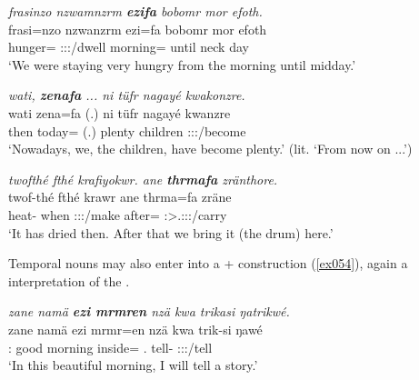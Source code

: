 \begin{exe}
	\ex \emph{frasinzo nzwamnzrm \textbf{ezifa} bobomr mor efoth.}\\
	\gll frasi=nzo nzwanzrm ezi=fa bobomr mor efoth\\
	hunger={\Only} \Fpl:\Sbj:\Pst:\Dur/dwell morning={\Abl} until neck day\\
	\trans `We were staying very hungry from the morning until midday.'\\ 
	\label{ex053}
\end{exe}
\begin{exe}
	\ex \emph{wati, \textbf{zenafa} ... ni tüfr nagayé kwakonzre.}\\
	\gll wati zena=fa (.) ni tüfr nagayé kwanzre\\
	then today={\Abl} (.) {\Fnsg} plenty children \Fpl:\Sbj:\Rpst:\Ipfv/become\\
	\trans `Nowadays, we, the children, have become plenty.' (lit. `From now on ...')\\ 
	\label{ex056}
\end{exe}
\begin{exe}
	\ex \emph{twofthé fthé krafiyokwr. ane \textbf{thrmafa} zränthore.}\\
	\gll twof-thé fthé krawr ane thrma=fa zräne\\
	heat-{\Adlzr} when \Stsg:\Sbj:\Irr:\Ipfv/make {\Dem} after={\Abl} \Fpl:\Sbj>\Tsg.\F:\Irr:\Pfv:\Venit/carry\\
	\trans `It has dried then. After that we bring it (the drum) here.'
	\label{ex059}
\end{exe}

\newpage 
Temporal nouns may also enter into a + construction (\ref{ex054}), again a  interpretation of the .

\begin{exe}
	\ex \emph{zane namä \textbf{ezi mrmren} nzä kwa trikasi ŋatrikwé.}\\
	\gll zane namä ezi mrmr=en nzä kwa trik-si ŋawé\\
	{\Dem}:{\Prox} good morning inside={\Loc} \Fsg.{\Abs} {\Fut} tell-{\Nmlz} \Fsg{}:\Sbj:\Nonpast:\Ipfv/tell\\
	\trans `In this beautiful morning, I will tell a story.' 
	\label{ex054}
\end{exe}

